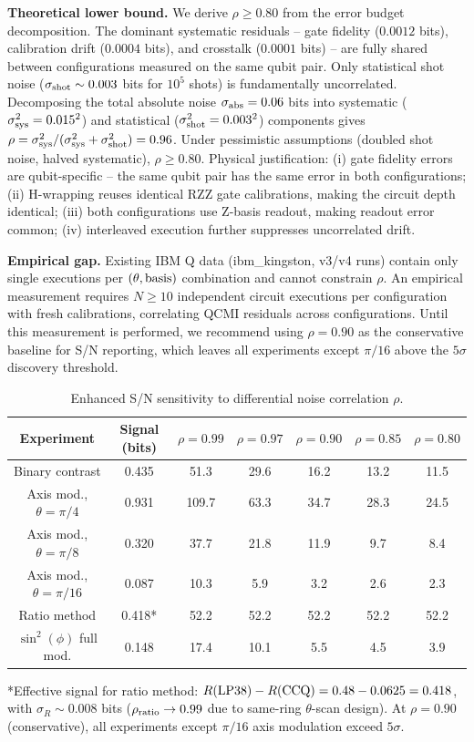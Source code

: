 \documentclass[aps,prl,showpacs]{revtex4-2}
\begin{document}
\textbf{Theoretical lower bound.} We derive $\rho \geq 0.80$ from the error budget decomposition. The dominant systematic residuals -- gate fidelity ($0.0012$ bits), calibration drift ($0.0004$ bits), and crosstalk ($0.0001$ bits) -- are fully shared between configurations measured on the same qubit pair. Only statistical shot noise ($\sigma_{\rm shot} \sim 0.003$ bits for $10^5$ shots) is fundamentally uncorrelated. Decomposing the total absolute noise $\sigma_{\rm abs} = 0.06$ bits into systematic ($\sigma_{\rm sys}^2 = 0.015^2$) and statistical ($\sigma_{\rm shot}^2 = 0.003^2$) components gives $\rho = \sigma_{\rm sys}^2/(\sigma_{\rm sys}^2 + \sigma_{\rm shot}^2) = 0.96$. Under pessimistic assumptions (doubled shot noise, halved systematic), $\rho \geq 0.80$. Physical justification: (i) gate fidelity errors are qubit-specific -- the same qubit pair has the same error in both configurations; (ii) H-wrapping reuses identical RZZ gate calibrations, making the circuit depth identical; (iii) both configurations use Z-basis readout, making readout error common; (iv) interleaved execution further suppresses uncorrelated drift.

\textbf{Empirical gap.} Existing IBM Q data (ibm\_kingston, v3/v4 runs) contain only single executions per $(\theta, {\rm basis})$ combination and cannot constrain $\rho$. An empirical measurement requires $N \geq 10$ independent circuit executions per configuration with fresh calibrations, correlating QCMI residuals across configurations. Until this measurement is performed, we recommend using $\rho = 0.90$ as the conservative baseline for S/N reporting, which leaves all experiments except $\pi/16$ above the $5\sigma$ discovery threshold.

\begin{table}[h]
\caption{Enhanced S/N sensitivity to differential noise correlation $\rho$.}
\begin{tabular}{c|c|c|c|c|c|c}
\hline
Experiment & Signal (bits) & $\rho=0.99$ & $\rho=0.97$ & $\rho=0.90$ & $\rho=0.85$ & $\rho=0.80$ \\
\hline
Binary contrast & 0.435 & 51.3 & 29.6 & 16.2 & 13.2 & 11.5 \\
Axis mod., $\theta=\pi/4$ & 0.931 & 109.7 & 63.3 & 34.7 & 28.3 & 24.5 \\
Axis mod., $\theta=\pi/8$ & 0.320 & 37.7 & 21.8 & 11.9 & 9.7 & 8.4 \\
Axis mod., $\theta=\pi/16$ & 0.087 & 10.3 & 5.9 & 3.2 & 2.6 & 2.3 \\
Ratio method & 0.418* & 52.2 & 52.2 & 52.2 & 52.2 & 52.2 \\
$\sin^2(\phi)$ full mod. & 0.148 & 17.4 & 10.1 & 5.5 & 4.5 & 3.9 \\
\hline
\end{tabular}
*Effective signal for ratio method: $R({\rm LP38}) - R({\rm CCQ}) = 0.48 - 0.0625 = 0.418$, with $\sigma_R \sim 0.008$ bits ($\rho_{\rm ratio} \to 0.99$ due to same-ring $\theta$-scan design). At $\rho=0.90$ (conservative), all experiments except $\pi/16$ axis modulation exceed $5\sigma$.
\end{table}
\end{document}
